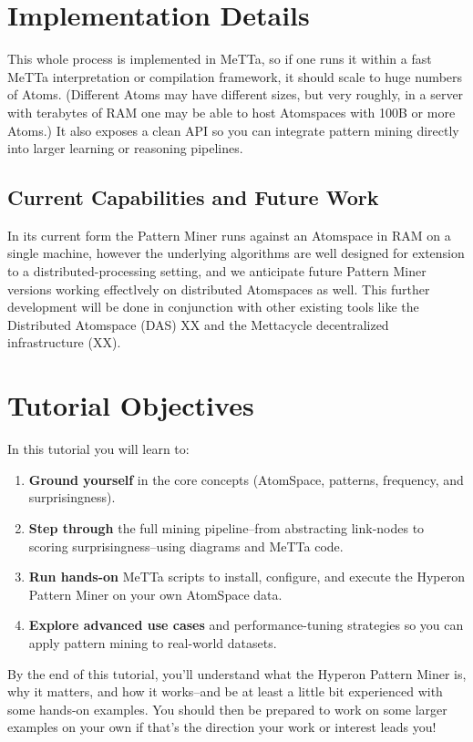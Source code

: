 \documentclass{article}
\begin{document}
\section{Implementation Details}

This whole process is implemented in MeTTa, so if one runs it within a fast MeTTa interpretation or compilation framework, it should scale to huge numbers  of Atoms.  (Different Atoms may have different sizes, but very roughly, in a server with terabytes of RAM one may be able to host Atomspaces with 100B or more Atoms.)   It also exposes a clean API so you can integrate pattern mining directly into larger learning or reasoning pipelines.

\subsection{Current Capabilities and Future Work}

In its current form the Pattern Miner runs against an Atomspace in RAM on a single machine, however the underlying algorithms are well designed for extension to a distributed-processing setting, and we anticipate future Pattern Miner versions working effectlvely on distributed Atomspaces as well.   This further development will be done in conjunction with other existing tools like the Distributed Atomspace (DAS) XX and the Mettacycle decentralized infrastructure (XX).

\section{Tutorial Objectives}

In this tutorial you will learn to:

\begin{enumerate}
  \item \textbf{Ground yourself} in the core concepts (AtomSpace, patterns, frequency, and surprisingness).
  \item \textbf{Step through} the full mining pipeline--from abstracting link-nodes to scoring surprisingness--using diagrams and MeTTa code.
  \item \textbf{Run hands-on} MeTTa scripts to install, configure, and execute the Hyperon Pattern Miner on your own AtomSpace data.
  \item \textbf{Explore advanced use cases} and performance-tuning strategies so you can apply pattern mining to real-world datasets.
\end{enumerate}

By the end of this tutorial, you'll understand what the Hyperon Pattern Miner is, why it matters, and how it works--and be at least a little bit experienced with some hands-on examples.   You should then be prepared to work on some larger examples on your own if that's the direction your work or interest leads you!
\end{document}
